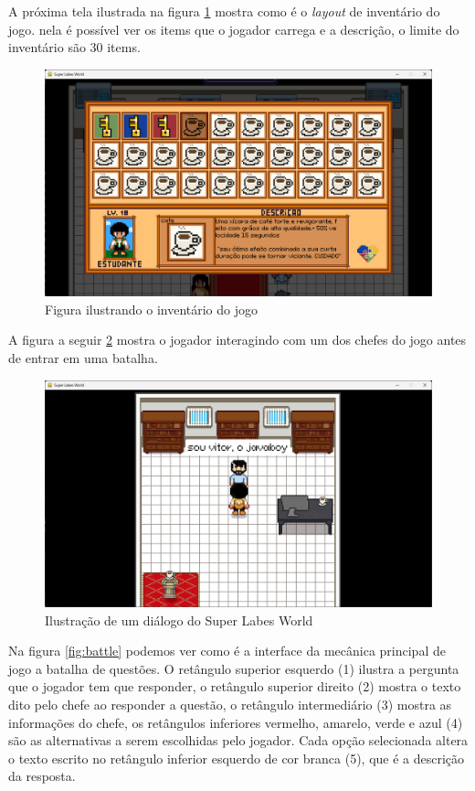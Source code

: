  \newpage
 A próxima tela ilustrada na figura \ref{fig:inventory} mostra como é o \textit{layout} de inventário do jogo. nela é possível ver os items que o jogador carrega e a descrição, o limite do inventário são 30 items. 
\begin{figure}[h!]
    \centering
    \includegraphics[width=1\linewidth]{figuras/inventory.png}
    \caption{Figura ilustrando o inventário do jogo}
    \label{fig:inventory}
\end{figure}

\clearpage
A figura a seguir \ref{fig:dialog} mostra o jogador interagindo com um dos chefes do jogo antes de entrar em uma batalha.

\begin{figure}[h!]
    \centering
    \includegraphics[width=1\linewidth]{figuras/dialog.png}
    \caption{Ilustração de um diálogo do Super Labes World}
    \label{fig:dialog}
\end{figure}
\newpage
Na figura \ref{fig:battle} podemos ver como é a interface da mecânica principal de jogo a batalha de questões. O retângulo superior esquerdo (1) ilustra a pergunta que o jogador tem que responder, o retângulo superior direito (2) mostra o texto dito pelo chefe ao responder a questão, o retângulo intermediário (3) mostra as informações do chefe, os retângulos inferiores vermelho, amarelo, verde e azul (4) são as alternativas a serem escolhidas pelo jogador. Cada opção selecionada altera o texto escrito no retângulo inferior esquerdo de cor branca (5), que é a descrição da resposta. 

